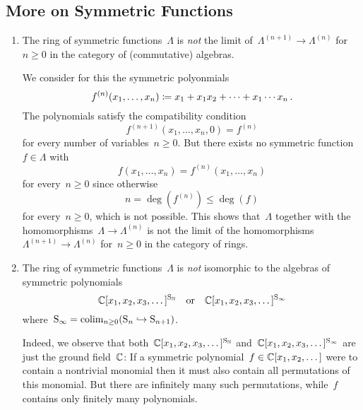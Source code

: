 \documentclass[a4paper,11pt]{scrartcl}
\begin{document}
\subsection{More on Symmetric Functions}
\label{wrong symmetric functions}

\begin{warning}
  \leavevmode
  \begin{enumerate}
    \item
      The ring of symmetric functions~$\Lambda$ is \emph{not} the limit of~$\Lambda^{(n+1)} \to \Lambda^{(n)}$ for~$n \geq 0$ in the category of (commutative) algebras.

      We consider for this the symmetric polyonmials
      \[
        f^{ (n) }(x_1, \dotsc, x_n)
        \coloneqq
        x_1 + x_1 x_2 + \dotsb + x_1 \dotsm x_n \,.
      \]
      The polynomials satisfy the compatibility condition
      \[
        f^{(n+1)}(x_1, \dotsc, x_n, 0)
        =
        f^{(n)}
      \]
      for every number of variables~$n \geq 0$.
      But there exists no symmetric function~$f \in \Lambda$ with
      \[
        f(x_1, \dotsc, x_n) = f^{(n)}(x_1, \dotsc, x_n)
      \]
      for every~$n \geq 0$ since otherwise
      \[
        n
        =
        \deg(f^{(n)})
        \leq
        \deg(f)
      \]
      for every~$n \geq 0$, which is not possible.
      This shows that~$\Lambda$ together with the homomorphisms~$\Lambda \to \Lambda^{(n)}$ is not the limit of the homomorphisms~$\Lambda^{(n+1)} \to \Lambda^{(n)}$ for~$n \geq 0$ in the category of rings.
    \item
      The ring of symmetric functions~$\Lambda$ is \emph{not} isomorphic to the algebras of symmetric polynomials
      \[
        \mathbb{C}[x_1, x_2, x_3, \dotsc]^{\mathrm{S}_{\mathbb{N}}}
        \quad\text{or}\quad
        \mathbb{C}[x_1, x_2, x_3, \dotsc]^{\mathrm{S}_\infty}
      \]
      where~$\mathrm{S}_\infty = \operatorname*{colim}_{n \geq 0} (\mathrm{S}_n \hookrightarrow \mathrm{S}_{n+1})$.

      Indeed, we observe that both~$\mathbb{C}[x_1, x_2, x_3, \dotsc]^{\mathrm{S}_{\mathbb{N}}}$ and~$\mathbb{C}[x_1, x_2, x_3, \dotsc]^{\mathrm{S}_\infty}$ are just the ground field~$\mathbb{C}$:
      If a symmetric polynomial~$f \in \mathbb{C}[x_1, x_2, \dotsc]$ were to contain a nontrivial monomial then it must also contain all permutations of this monomial.
      But there are infinitely many such permutations, while~$f$ contains only finitely many polynomials.
  \end{enumerate}
\end{warning}
\end{document}
